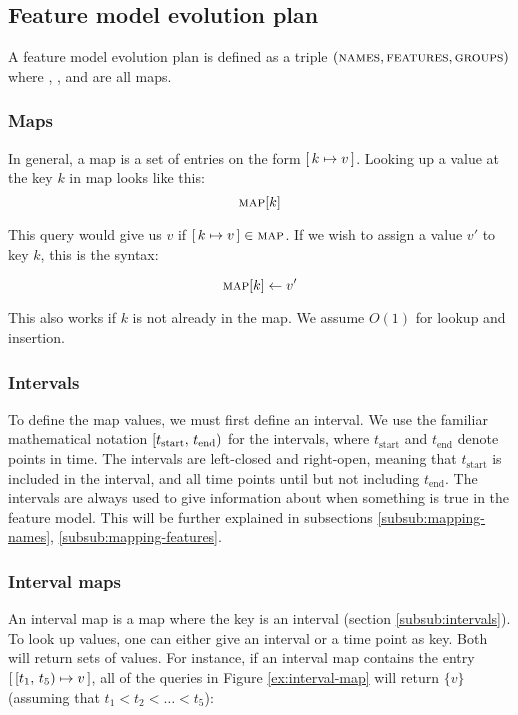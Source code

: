 
\subsection{Feature model evolution plan}
\label{sub:feature-model-evolution-plan}
A feature model evolution plan is defined as a triple $(\textsc{names}, \textsc{features}, \textsc{groups}{})$ where \names, \features, and \groups{} are all maps.

\subsubsection{Maps}
\label{subsub:maps}
In general, a map is a set of entries on the form $[\,k \mapsto v\,]$. Looking up a value at the key $k$ in map  looks like this:
\[
  \textsc{map}[k]
\]

This query would give us $v$ if $[\,k \mapsto v\,] \in \textsc{map}$. If we wish to assign a value $v'$ to key $k$, this is the syntax:

\[
  \textsc{map}[k] \leftarrow v'
\]

This also works if $k$ is not already in the map. We assume $O(1)$ for lookup and insertion.

\subsubsection{Intervals}
\label{subsub:intervals}
To define the map values, we must first define an interval. We use the familiar mathematical notation $[t_\text{start},\, t_\text{end})$ for the intervals, where $t_\text{start}$ and $t_\text{end}$ denote points in time. The intervals are left-closed and right-open, meaning that $t_\text{start}$ is included in the interval, and all time points until but not including $t_\text{end}$. The intervals are always used to give information about when something is true in the feature model. This will be further explained in subsections \ref{subsub:mapping-names}, \ref{subsub:mapping-features}. 

\subsubsection{Interval maps}
\label{subsub:interval-maps}
An interval map is a map where the key is an interval (section \vref{subsub:intervals}). To look up values, one can either give an interval or a time point as key. Both will return sets of values. For instance, if an interval map  contains the entry $[\,[t_1,\, t_5) \mapsto v\,]$, all of the queries in Figure \vref{ex:interval-map} will return $\{v\}$ (assuming that $t_1 < t_2 < \ldots < t_5$):

